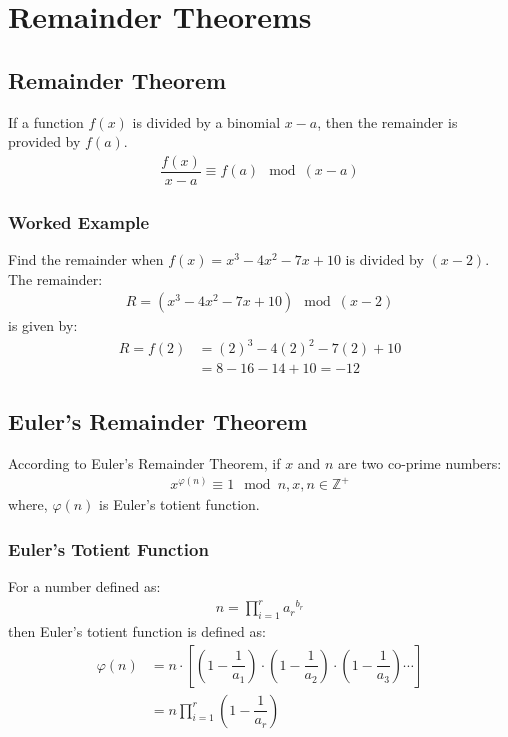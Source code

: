\documentclass[../main.tex]{subfiles}
\begin{document}
	\chapter{Remainder Theorems}
	\section{Remainder Theorem}
	If a function $f(x)$ is divided by a binomial $x-a$, then the remainder is provided by $f(a)$.
	\begin{align}
		\dfrac{f(x)}{x-a} \equiv f(a) \mod \left(x-a\right)
	\end{align}
	
	\subsection*{Worked Example}
	Find the remainder when $f(x) = x^3 - 4 x^2 - 7 x + 10$ is divided by $(x-2)$.\\
	The remainder:
	\begin{align*}
		R = \left(x^3 - 4 x^2 - 7 x + 10\right)\mod\left(x-2\right)
	\end{align*}
	is given by:
	\begin{align*}
		R = f(2) & = (2)^3 - 4 (2)^2 - 7(2) + 10\\ & = 8 - 16 - 14 + 10 = -12
	\end{align*}
	
	\section{Euler's Remainder Theorem}
	According to Euler's Remainder Theorem, if $x$ and $n$ are two co-prime numbers:
	\begin{align}
		x^{\varphi (n)} \equiv 1 \mod n, x,n \in \mathbb{Z}^+
	\end{align}
	where, $\varphi(n)$ is Euler's totient function.
	
	\subsection{Euler's Totient Function}
	For a number defined as:
	\begin{align}
		n=\prod_{i=1}^r {a_r}^{b_r}
	\end{align}
	then Euler's totient function is defined as:
	\begin{align}
		\varphi(n) & = n \cdot \left[\left( 1 - \dfrac{1}{a_1} \right) \cdot \left( 1 - \dfrac{1}{a_2} \right) \cdot \left( 1 - \dfrac{1}{a_3} \right) \cdots \right] \nonumber \\
		& = n \prod_{i=1}^r \left(1 - \dfrac{1}{a_r} \right)
	\end{align}
\end{document}
